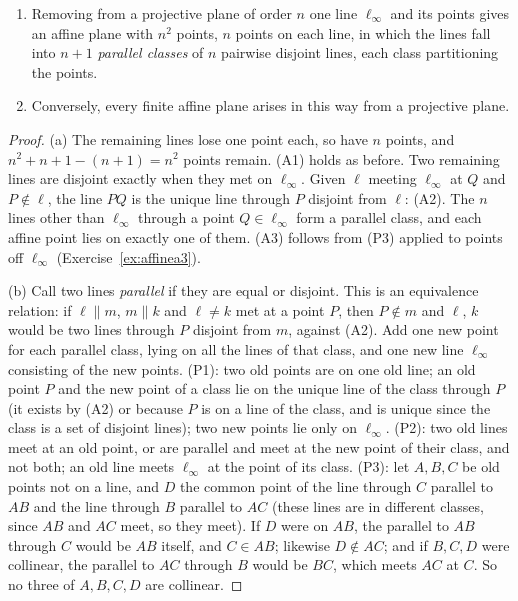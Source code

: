 \begin{proposition}\label{prop:affine}
\begin{enumerate}[label=(\alph*)]
\item Removing from a projective plane of order $n$ one line $\ell_\infty$ and its points gives an affine plane with $n^2$ points, $n$ points on each line, in which the lines fall into $n+1$
\emph{parallel classes} of $n$ pairwise disjoint lines, each class partitioning the points.
\item Conversely, every finite affine plane arises in this way from a projective plane.
\end{enumerate}
\end{proposition}
\begin{proof}
(a) The remaining lines lose one point each, so have $n$ points, and $n^2+n+1-(n+1)=n^2$ points remain. (A1) holds as before. Two remaining lines are disjoint exactly when they met on $\ell_\infty$.
Given $\ell$ meeting $\ell_\infty$ at $Q$ and $P\notin\ell$, the line $PQ$ is the unique line through $P$ disjoint from $\ell$: (A2). The $n$ lines other than $\ell_\infty$ through a point $Q\in\ell_\infty$ form a
parallel class, and each affine point lies on exactly one of them. (A3) follows from (P3) applied to points off $\ell_\infty$ (Exercise~\ref{ex:affinea3}).

(b) Call two lines \emph{parallel} if they are equal or disjoint. This is an equivalence relation: if $\ell\parallel m$, $m\parallel k$ and $\ell\ne k$ met at a point $P$, then $P\notin m$ and $\ell$, $k$ would be two
lines through $P$ disjoint from $m$, against (A2). Add one new point for each parallel class, lying on all the lines of that class, and one new line $\ell_\infty$ consisting of the new points. (P1): two old
points are on one old line; an old point $P$ and the new point of a class lie on the unique line of the class through $P$ (it exists by (A2) or because $P$ is on a line of the class, and is unique since
the class is a set of disjoint lines); two new points lie only on $\ell_\infty$. (P2): two old lines meet at an old point, or are parallel and meet at the new point of their class, and not both;
an old line meets $\ell_\infty$ at the point of its class. (P3): let $A,B,C$ be old points not on a line, and $D$ the common point of the line through $C$ parallel to $AB$ and the line through $B$
parallel to $AC$ (these lines are in different classes, since $AB$ and $AC$ meet, so they meet). If $D$ were on $AB$, the parallel to $AB$ through $C$ would be $AB$ itself, and $C\in AB$; likewise $D\notin AC$; and if $B,C,D$
were collinear, the parallel to $AC$ through $B$ would be $BC$, which meets $AC$ at $C$. So no three of $A,B,C,D$ are collinear.
\end{proof}

